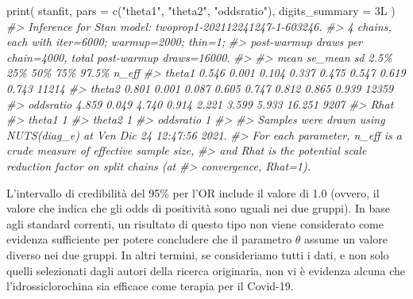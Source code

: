 \documentclass[
  10pt,
  italian,
  a4paper,
  extrafontsizes,onecolumn,openright
  ]{memoir}
\newenvironment{Shaded}{\begin{snugshade}}{\end{snugshade}}
\newcommand{\AttributeTok}[1]{\textcolor[rgb]{0.77,0.63,0.00}{#1}}
\newcommand{\CommentTok}[1]{\textcolor[rgb]{0.56,0.35,0.01}{\textit{#1}}}
\newcommand{\FunctionTok}[1]{\textcolor[rgb]{0.00,0.00,0.00}{#1}}
\newcommand{\NormalTok}[1]{#1}
\newcommand{\OtherTok}[1]{\textcolor[rgb]{0.56,0.35,0.01}{#1}}
\newcommand{\SpecialCharTok}[1]{\textcolor[rgb]{0.00,0.00,0.00}{#1}}
\newcommand{\StringTok}[1]{\textcolor[rgb]{0.31,0.60,0.02}{#1}}
\begin{document}
\begin{Shaded}
\end{Shaded}

\begin{Shaded}
\begin{Highlighting}[]
\FunctionTok{print}\NormalTok{(}
\NormalTok{  stanfit,}
  \AttributeTok{pars =} \FunctionTok{c}\NormalTok{(}\StringTok{"theta1"}\NormalTok{, }\StringTok{"theta2"}\NormalTok{, }\StringTok{"oddsratio"}\NormalTok{),}
  \AttributeTok{digits\_summary =}\NormalTok{ 3L}
\NormalTok{)}
\CommentTok{\#\textgreater{} Inference for Stan model: twoprop1{-}202112241247{-}1{-}603246.}
\CommentTok{\#\textgreater{} 4 chains, each with iter=6000; warmup=2000; thin=1; }
\CommentTok{\#\textgreater{} post{-}warmup draws per chain=4000, total post{-}warmup draws=16000.}
\CommentTok{\#\textgreater{} }
\CommentTok{\#\textgreater{}            mean se\_mean    sd  2.5\%   25\%   50\%   75\%  97.5\% n\_eff}
\CommentTok{\#\textgreater{} theta1    0.546   0.001 0.104 0.337 0.475 0.547 0.619  0.743 11214}
\CommentTok{\#\textgreater{} theta2    0.801   0.001 0.087 0.605 0.747 0.812 0.865  0.939 12359}
\CommentTok{\#\textgreater{} oddsratio 4.859   0.049 4.740 0.914 2.221 3.599 5.933 16.251  9207}
\CommentTok{\#\textgreater{}           Rhat}
\CommentTok{\#\textgreater{} theta1       1}
\CommentTok{\#\textgreater{} theta2       1}
\CommentTok{\#\textgreater{} oddsratio    1}
\CommentTok{\#\textgreater{} }
\CommentTok{\#\textgreater{} Samples were drawn using NUTS(diag\_e) at Ven Dic 24 12:47:56 2021.}
\CommentTok{\#\textgreater{} For each parameter, n\_eff is a crude measure of effective sample size,}
\CommentTok{\#\textgreater{} and Rhat is the potential scale reduction factor on split chains (at }
\CommentTok{\#\textgreater{} convergence, Rhat=1).}
\end{Highlighting}
\end{Shaded}

L'intervallo di credibilità del 95\% per l'OR include il valore di 1.0 (ovvero, il valore che indica che gli odds di positività sono uguali nei due gruppi). In base agli standard correnti, un risultato di questo tipo non viene considerato come evidenza sufficiente per potere concludere che il parametro \(\theta\) assume un valore diverso nei due gruppi. In altri termini, se consideriamo tutti i dati, e non solo quelli selezionati dagli autori della ricerca originaria, non vi è evidenza alcuna che l'idrossiclorochina sia efficace come terapia per il Covid-19.
\end{document}
